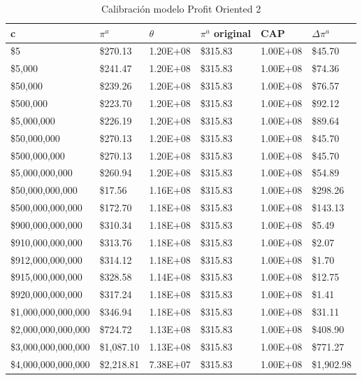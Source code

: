 \begin{table}[H]
    \centering
    \begin{tabular}{|l|l|l|l|l|l|}
    \hline
        c & $\pi^a$ & $\theta$ & $\pi^a$ original &  CAP& $\Delta \pi^a$  \\ \hline
         \$5  &  \$270.13  & 1.20E+08 &  \$315.83  & 1.00E+08 &  \$45.70   \\ \hline
         \$5,000  &  \$241.47  & 1.20E+08 &  \$315.83  & 1.00E+08 &  \$74.36   \\ \hline
         \$50,000  &  \$239.26  & 1.20E+08 &  \$315.83  & 1.00E+08 &  \$76.57   \\ \hline
         \$500,000  &  \$223.70  & 1.20E+08 &  \$315.83  & 1.00E+08 &  \$92.12   \\ \hline
         \$5,000,000  &  \$226.19  & 1.20E+08 &  \$315.83  & 1.00E+08 &  \$89.64   \\ \hline
         \$50,000,000  &  \$270.13  & 1.20E+08 &  \$315.83  & 1.00E+08 &  \$45.70   \\ \hline
         \$500,000,000  &  \$270.13  & 1.20E+08 &  \$315.83  & 1.00E+08 &  \$45.70   \\ \hline
         \$5,000,000,000  &  \$260.94  & 1.20E+08 &  \$315.83  & 1.00E+08 &  \$54.89   \\ \hline
         \$50,000,000,000  &  \$17.56  & 1.16E+08 &  \$315.83  & 1.00E+08 &  \$298.26   \\ \hline
         \$500,000,000,000  &  \$172.70  & 1.18E+08 &  \$315.83  & 1.00E+08 &  \$143.13   \\ \hline
         \$900,000,000,000  &  \$310.34  & 1.18E+08 &  \$315.83  & 1.00E+08 &  \$5.49   \\ \hline
         \$910,000,000,000  &  \$313.76  & 1.18E+08 &  \$315.83  & 1.00E+08 &  \$2.07   \\ \hline
         \$912,000,000,000  &  \$314.12  & 1.18E+08 &  \$315.83  & 1.00E+08 &  \$1.70   \\ \hline
         \$915,000,000,000  &  \$328.58  & 1.14E+08 &  \$315.83  & 1.00E+08 &  \$12.75   \\ \hline
         \$920,000,000,000  &  \$317.24  & 1.18E+08 &  \$315.83  & 1.00E+08 &  \$1.41   \\ \hline
         \$1,000,000,000,000  &  \$346.94  & 1.18E+08 &  \$315.83  & 1.00E+08 &  \$31.11   \\ \hline
         \$2,000,000,000,000  &  \$724.72  & 1.13E+08 &  \$315.83  & 1.00E+08 &  \$408.90   \\ \hline
         \$3,000,000,000,000  &  \$1,087.10  & 1.13E+08 &  \$315.83  & 1.00E+08 &  \$771.27   \\ \hline
         \$4,000,000,000,000  &  \$2,218.81  & 7.38E+07 &  \$315.83  & 1.00E+08 &  \$1,902.98   \\ \hline
    \end{tabular}
    \caption{{\footnotesize Calibración modelo Profit Oriented 2}}
    \label{calibracionPO2}
\end{table}

